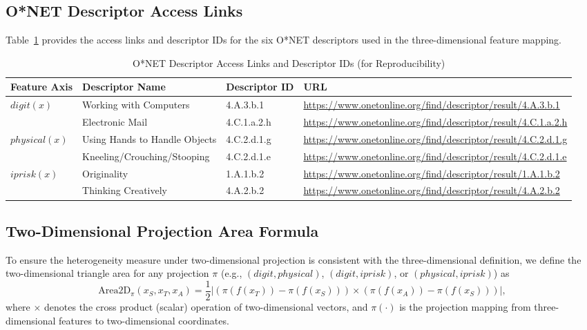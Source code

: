 \begin{appendices}

\subsection{O*NET Descriptor Access Links}
\label{appendix:onet_urls}

Table~\ref{tab:onet_descriptor_urls} provides the access links and descriptor IDs for the six O*NET descriptors used in the three-dimensional feature mapping.

\begin{table}[H]
\centering
\caption{O*NET Descriptor Access Links and Descriptor IDs (for Reproducibility)}
\label{tab:onet_descriptor_urls}
\small
\begin{tabular}{@{}>{\raggedright\arraybackslash}p{2.2cm} >{\raggedright\arraybackslash}p{4.0cm} >{\raggedright\arraybackslash}p{2.3cm} >{\raggedright\arraybackslash}p{6.2cm}@{}}
\toprule
\textbf{Feature Axis} & \textbf{Descriptor Name} & \textbf{Descriptor ID} & \textbf{URL} \\
\midrule
$digit(x)$ & Working with Computers & 4.A.3.b.1 & \url{https://www.onetonline.org/find/descriptor/result/4.A.3.b.1} \\
 & Electronic Mail & 4.C.1.a.2.h & \url{https://www.onetonline.org/find/descriptor/result/4.C.1.a.2.h} \\
\addlinespace
$physical(x)$ & Using Hands to Handle Objects & 4.C.2.d.1.g & \url{https://www.onetonline.org/find/descriptor/result/4.C.2.d.1.g} \\
 & Kneeling/Crouching/Stooping & 4.C.2.d.1.e & \url{https://www.onetonline.org/find/descriptor/result/4.C.2.d.1.e} \\
\addlinespace
$iprisk(x)$ & Originality & 1.A.1.b.2 & \url{https://www.onetonline.org/find/descriptor/result/1.A.1.b.2} \\
 & Thinking Creatively & 4.A.2.b.2 & \url{https://www.onetonline.org/find/descriptor/result/4.A.2.b.2} \\
\bottomrule
\end{tabular}
\end{table}

\subsection{Two-Dimensional Projection Area Formula}
\label{appendix:area2d_formula}

To ensure the heterogeneity measure under two-dimensional projection is consistent with the three-dimensional definition, we define the two-dimensional triangle area for any projection $\pi$ (e.g., $(digit, physical)$, $(digit, iprisk)$, or $(physical, iprisk)$) as
\[
\mathrm{Area2D}_{\pi}(x_S,x_T,x_A)=\frac{1}{2}\left|\left(\pi(f(x_T))-\pi(f(x_S))\right)\times\left(\pi(f(x_A))-\pi(f(x_S))\right)\right|,
\]
where $\times$ denotes the cross product (scalar) operation of two-dimensional vectors, and $\pi(\cdot)$ is the projection mapping from three-dimensional features to two-dimensional coordinates.


\end{appendices}
